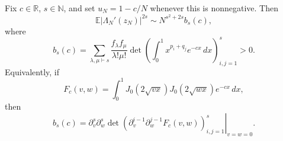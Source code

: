 \begin{theorem}
\label{thm:SW-microscopic}
Fix $c\in\mathbb R$, $s\in\mathbb N$, and set $u_N=1-c/N$ whenever this is nonnegative.
Then
\begin{equation}
 \mathbb E|\Lambda_N'(z_N)|^{2s}\sim N^{s^2+2s}b_s(c),
 \label{eq:SW-microscopic}
\end{equation}
where
\begin{equation}
 b_s(c)=\sum_{\lambda,\mu\vdash s}\frac{f_\lambda f_\mu}{\lambda!\mu!}
 \det\!\left(\int_0^1x^{p_i+q_j}e^{-cx}\,dx\right)_{i,j=1}^{s}>0.
 \label{eq:SW-bs-partitions}
\end{equation}
Equivalently, if
\begin{equation}
 F_c(v,w)=\int_0^1J_0(2\sqrt{vx})J_0(2\sqrt{wx})e^{-cx}\,dx,
 \label{eq:SW-Fc}
\end{equation}
then
\begin{equation}
 b_s(c)=\left.\partial_v^s\partial_w^s
 \det\!\left(\partial_v^{i-1}\partial_w^{j-1}F_c(v,w)
 \right)_{i,j=1}^{s}\right|_{v=w=0}.
 \label{eq:SW-bs-Bessel}
\end{equation}
\end{theorem}

